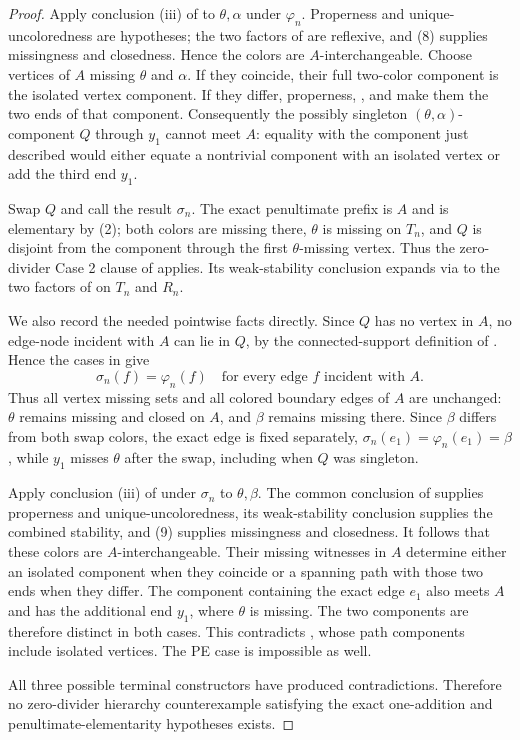 \begin{proof}
Apply conclusion (iii) of  to $\theta,\alpha$
under $\varphi_n$.  Properness and unique-uncoloredness are hypotheses;
the two factors of  are reflexive, and
(8) supplies missingness and closedness.  Hence the colors are
$A$-interchangeable.  Choose vertices of $A$ missing $\theta$ and
$\alpha$.  If they coincide, their full two-color component is the
isolated vertex component.  If they differ, properness,
, and
 make them the two ends of that
component.  Consequently the possibly singleton
$(\theta,\alpha)$-component $Q$ through $y_1$ cannot meet $A$: equality
with the component just described would either equate a nontrivial
component with an isolated vertex or add the third end $y_1$.

Swap $Q$ and call the result $\sigma_n$.  The exact penultimate prefix
is $A$ and is elementary by (2); both colors are missing there,
$\theta$ is missing on $T_n$, and $Q$ is disjoint from the component
through the first $\theta$-missing vertex.  Thus the zero-divider Case
2 clause of  applies.  Its weak-stability
conclusion expands via  to the two
factors of  on $T_n$ and $R_n$.

We also record the needed pointwise facts directly.  Since $Q$ has no
vertex in $A$, no edge-node incident with $A$ can lie in $Q$, by the
connected-support definition of .  Hence
the cases in  give
\[
 \sigma_n(f)=\varphi_n(f)
 \quad\text{for every edge $f$ incident with $A$}.            \tag{9}
\]
Thus all vertex missing sets and all colored boundary edges of $A$ are
unchanged: $\theta$ remains missing and closed on $A$, and $\beta$
remains missing there.  Since $\beta$ differs from both swap colors,
the exact edge is fixed separately,
$\sigma_n(e_1)=\varphi_n(e_1)=\beta$, while $y_1$ misses $\theta$
after the swap, including when $Q$ was singleton.

Apply conclusion (iii) of  under $\sigma_n$ to
$\theta,\beta$.  The common conclusion of
 supplies properness and unique-uncoloredness, its
weak-stability conclusion supplies the combined stability, and (9)
supplies missingness and closedness.  It follows that these colors are
$A$-interchangeable.  Their missing witnesses in $A$ determine either
an isolated component when they coincide or a spanning path with those
two ends when they differ.  The component containing the exact edge
$e_1$ also meets $A$ and has the additional end $y_1$, where $\theta$
is missing.  The two components are therefore distinct in both cases.
This contradicts , whose path components
include isolated vertices.  The PE case is impossible as well.

All three possible terminal constructors have produced contradictions.
Therefore no zero-divider hierarchy counterexample satisfying the exact
one-addition and penultimate-elementarity hypotheses exists.
\end{proof}
